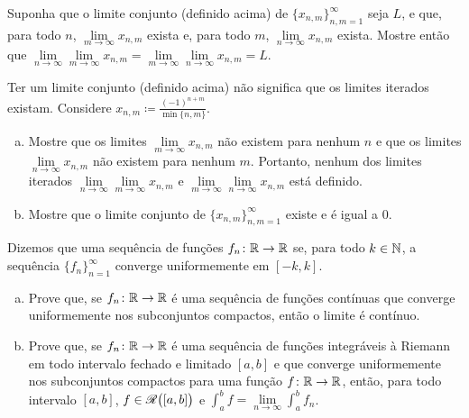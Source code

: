 \begin{exercise}
Suponha que o limite conjunto (definido acima) de
$\{ x_{n,m} \}_{n,m=1}^\infty$ seja $L$, e que, para todo $n$,
$\lim\limits_{m \to \infty} x_{n,m}$ exista e, para todo $m$,
$\lim\limits_{n \to \infty} x_{n,m}$ exista. Mostre então que
$\lim\limits_{n\to\infty}\lim\limits_{m \to \infty} x_{n,m}
=
\lim\limits_{m\to\infty}\lim\limits_{n \to \infty} x_{n,m} = L$.
\end{exercise}

\begin{exercise}
Ter um limite conjunto (definido acima) não significa que os limites iterados existam.
Considere $x_{n,m} \coloneqq \frac{{(-1)}^{n+m}}{\min \{n,m \}}$.
\begin{enumerate}[a)]
\item
Mostre que os limites $\lim\limits_{m \to \infty} x_{n,m}$ não existem
para nenhum $n$ e que os limites $\lim\limits_{n \to \infty} x_{n,m}$
não existem para nenhum $m$. Portanto, nenhum dos limites iterados
$\lim\limits_{n\to\infty}\lim\limits_{m \to \infty} x_{n,m}$ e
$\lim\limits_{m\to\infty}\lim\limits_{n \to \infty} x_{n,m}$ está definido.
\item
Mostre que o limite conjunto de $\{ x_{n,m} \}_{n,m=1}^\infty$ existe e é igual a 0.
\end{enumerate}
\end{exercise}

\begin{exercise}
Dizemos que uma sequência de funções $f_n \colon {\mathbb{R}} \to {\mathbb{R}}$
\emph{}
se, para todo $k \in {\mathbb{N}}$, a sequência $\{ f_n \}_{n=1}^\infty$
converge uniformemente em $[-k,k]$.
\begin{enumerate}[a)]
\item
Prove que, se $f_n \colon {\mathbb{R}} \to {\mathbb{R}}$ é uma sequência de funções
contínuas que converge uniformemente nos subconjuntos compactos, então o
limite é contínuo.
\item 
Prove que, se $f_n \colon {\mathbb{R}} \to {\mathbb{R}}$ é uma sequência de funções
integráveis à Riemann em todo intervalo fechado e limitado $[a,b]$ e que
converge uniformemente nos subconjuntos compactos para uma função
$f \colon {\mathbb{R}} \to {\mathbb{R}}$, então, para todo intervalo $[a,b]$,
$f \in {\mathscr{R}}\bigl([a,b]\bigr)$ e
$\int_a^b f = \lim\limits_{n\to\infty} \int_a^b f_n$.
\end{enumerate}
\end{exercise}

